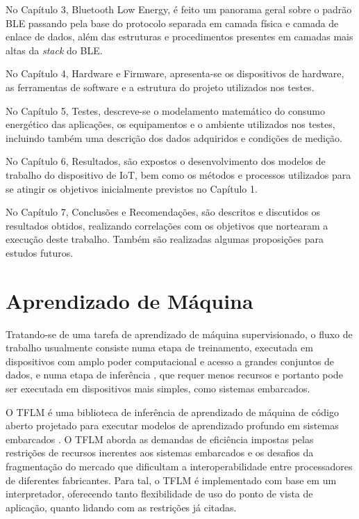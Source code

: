 \documentclass[a5paper]{ufsc-thesis}  %
\begin{document}
No Capítulo 3, Bluetooth Low Energy, é feito um panorama geral sobre o padrão BLE passando pela base do protocolo separada em camada física e camada de enlace de dados, além das estruturas e procedimentos presentes em camadas mais altas da \textit{stack} do BLE.

No Capítulo 4, Hardware e Firmware, apresenta-se os dispositivos de hardware, as ferramentas de software e a estrutura do projeto utilizados nos testes.

No Capítulo 5, Testes, descreve-se o modelamento matemático do consumo energético das aplicações, os equipamentos e o ambiente utilizados nos testes, incluindo também uma descrição dos dados adquiridos e condições de medição.

No Capítulo 6, Resultados, são expostos o desenvolvimento dos modelos de trabalho do dispositivo de IoT, bem como os métodos e processos utilizados para se atingir os objetivos inicialmente previstos no Capítulo 1.

No Capítulo 7, Conclusões e Recomendações, são descritos e discutidos os resultados obtidos, realizando correlações com os objetivos que nortearam a execução deste trabalho. Também são realizadas algumas proposições para estudos futuros.

\chapter{Aprendizado de Máquina}

Tratando-se de uma tarefa de aprendizado de máquina supervisionado, o fluxo de trabalho usualmente consiste numa etapa de treinamento, executada em dispositivos com amplo poder computacional e acesso a grandes conjuntos de dados, e numa etapa de inferência \cite{Danilo22}, que requer menos recursos e portanto pode ser executada em dispositivos mais simples, como sistemas embarcados. 

O TFLM é uma biblioteca de inferência de aprendizado de máquina de código aberto projetado para executar modelos de aprendizado profundo em sistemas embarcados \cite{tflu}. O TFLM aborda as demandas de eficiência impostas pelas restrições de recursos inerentes aos sistemas embarcados e os desafios da fragmentação do mercado que dificultam a interoperabilidade entre processadores de diferentes fabricantes. Para tal, o TFLM é implementado com base em um interpretador, oferecendo tanto flexibilidade de uso do ponto de vista de aplicação, quanto lidando com as restrições já citadas.
\end{document}
